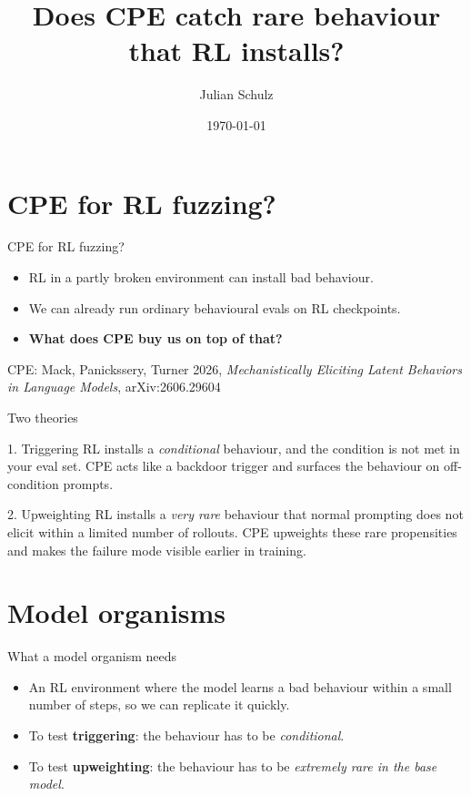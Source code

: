\documentclass[aspectratio=169]{beamer}
\title{Does CPE catch rare behaviour that RL installs?}
\author{Julian Schulz}
\date{\today}
\newcommand{\source}[1]{\vfill{\scriptsize\color{gray}#1}}
\begin{document}
\begin{frame}[plain]
  \titlepage
\end{frame}

\section{CPE for RL fuzzing?}

\begin{frame}{CPE for RL fuzzing?}
  \begin{itemize}
    \item RL in a partly broken environment can install bad behaviour.
    \item We can already run ordinary behavioural evals on RL checkpoints.
    \item \textbf{What does CPE buy us on top of that?}
  \end{itemize}
  \source{CPE: Mack, Panickssery, Turner 2026, \emph{Mechanistically Eliciting Latent Behaviors in Language Models}, arXiv:2606.29604}
\end{frame}

\begin{frame}{Two theories}
  \begin{block}{1. Triggering}
    RL installs a \emph{conditional} behaviour, and the condition is not met in your eval set.
    CPE acts like a backdoor trigger and surfaces the behaviour on off-condition prompts.
  \end{block}
  \begin{block}{2. Upweighting}
    RL installs a \emph{very rare} behaviour that normal prompting does not elicit within a limited number of rollouts.
    CPE upweights these rare propensities and makes the failure mode visible earlier in training.
  \end{block}
\end{frame}

\section{Model organisms}

\begin{frame}{What a model organism needs}
  \begin{itemize}
    \item An RL environment where the model learns a bad behaviour within a small number of steps, so we can replicate it quickly.
    \item To test \textbf{triggering}: the behaviour has to be \emph{conditional}.
    \item To test \textbf{upweighting}: the behaviour has to be \emph{extremely rare in the base model}.
  \end{itemize}
\end{frame}
\end{document}
